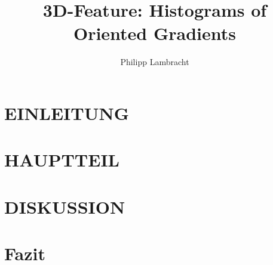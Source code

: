 \documentclass[a4paper, 10pt, conference]{ieeeconf_de}
\title{\LARGE \bf
3D-Feature: Histograms of Oriented Gradients
}
\author{Philipp Lambracht}
\begin{document}
\maketitle
\thispagestyle{empty}
\pagestyle{empty}



\begin{abstract}

	

\end{abstract}


\section{EINLEITUNG}

	

\section{HAUPTTEIL}




\section{DISKUSSION}


\section{Fazit}

   

\addtolength{\textheight}{-12cm}  %




\end{document}
